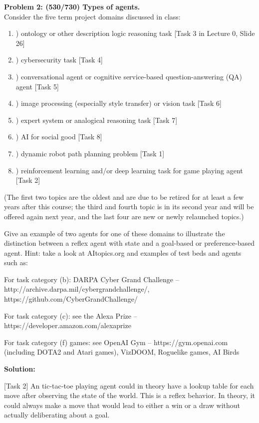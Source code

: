 \documentclass{amsart}
\theoremstyle{definition}
\begin{document}
\textbf{Problem 2: (530/730) Types of agents.} \\
Consider the five term project domains discussed in class:
\begin{enumerate}[label=\alph*]
\item) ontology or other description logic reasoning task [Task 3 in Lecture 0, Slide 26]
\item) cybersecurity task [Task 4]
\item) conversational agent or cognitive service-based question-answering (QA) agent [Task 5]
\item) image processing (especially style transfer) or vision task [Task 6]
\item) expert system or analogical reasoning task [Task 7]
\item) AI for social good [Task 8]
\item) dynamic robot path planning problem [Task 1]
\item) reinforcement learning and/or deep learning task for game playing agent [Task 2]
\end{enumerate}
(The first two topics are the oldest and are due to be retired for at least a few years after this course; the third and fourth topic is in its second year and will be offered again next year, and the last four are new or newly relaunched topics.)

Give an example of two agents for one of these domains to illustrate the distinction between
a reflex agent with state and a goal-based or preference-based agent. Hint: take a look at AItopics.org and examples of test beds and agents such as:

For task category (b): DARPA Cyber Grand Challenge – http://archive.darpa.mil/cybergrandchallenge/, https://github.com/CyberGrandChallenge/

For task category (c): see the Alexa Prize – https://developer.amazon.com/alexaprize

For task category (f) games: see OpenAI Gym – https://gym.openai.com (including DOTA2 and Atari games), VizDOOM, Roguelike games, AI Birds


\bigbreak

\textbf{Solution:}

[Task 2]
An tic-tac-toe playing agent could in theory have a lookup table for each move after observing the state of the world.
This is a reflex behavior.
In theory, it could always make a move that would lead to either a win or a draw without actually deliberating about a goal.
\end{document}
